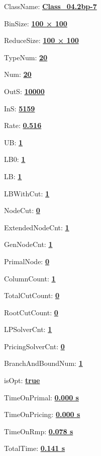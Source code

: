 \documentclass[11pt]{article}
\begin{document}
\pagestyle{empty}


ClassName: \underline{\textbf{Class_04.2bp-7}}
\par
BinSize: \underline{\textbf{100 × 100}}
\par
ReduceSize: \underline{\textbf{100 × 100}}
\par
TypeNum: \underline{\textbf{20}}
\par
Num: \underline{\textbf{20}}
\par
OutS: \underline{\textbf{10000}}
\par
InS: \underline{\textbf{5159}}
\par
Rate: \underline{\textbf{0.516}}
\par
UB: \underline{\textbf{1}}
\par
LB0: \underline{\textbf{1}}
\par
LB: \underline{\textbf{1}}
\par
LBWithCut: \underline{\textbf{1}}
\par
NodeCut: \underline{\textbf{0}}
\par
ExtendedNodeCnt: \underline{\textbf{1}}
\par
GenNodeCnt: \underline{\textbf{1}}
\par
PrimalNode: \underline{\textbf{0}}
\par
ColumnCount: \underline{\textbf{1}}
\par
TotalCutCount: \underline{\textbf{0}}
\par
RootCutCount: \underline{\textbf{0}}
\par
LPSolverCnt: \underline{\textbf{1}}
\par
PricingSolverCnt: \underline{\textbf{0}}
\par
BranchAndBoundNum: \underline{\textbf{1}}
\par
isOpt: \underline{\textbf{true}}
\par
TimeOnPrimal: \underline{\textbf{0.000 s}}
\par
TimeOnPricing: \underline{\textbf{0.000 s}}
\par
TimeOnRmp: \underline{\textbf{0.078 s}}
\par
TotalTime: \underline{\textbf{0.141 s}}
\par
\newpage
\end{document}
